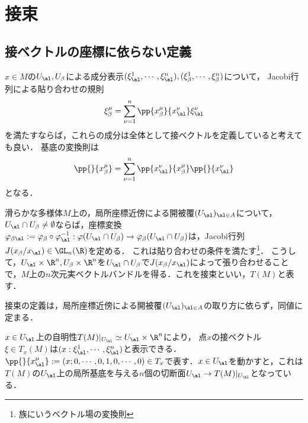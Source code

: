 \documentclass[uplatex,dvipdfmx]{jsreport}
\begin{document}
\section{接束}

\subsection{接ベクトルの座標に依らない定義}

\begin{tcolorbox}[colframe=ForestGreen, colback=ForestGreen!10!white,breakable,colbacktitle=ForestGreen!40!white,coltitle=black,fonttitle=\bfseries\sffamily,
title=]
    $x\in M$の$U_\al,U_\beta$による成分表示$(\xi_\al^1,\cdots,\xi_\al^n),(\xi_\beta^1,\cdots,\xi_\beta^n)$について，
    Jacobi行列による貼り合わせの規則
    \[\xi_\beta^\mu=\sum^n_{\nu=1}\pp{x_\beta^\mu}{x_\al^\nu}\xi_\al^\nu\]
    を満たすならば，これらの成分は全体として接ベクトルを定義していると考えても良い．
    基底の変換則は
    \[\pp{}{x_\beta^\mu}=\sum^n_{\nu=1}\pp{x_\al^\nu}{x_\beta^\mu}\pp{}{x_\al^\nu}\]
    となる．
\end{tcolorbox}

\begin{definition}
    滑らかな多様体$M$上の，局所座標近傍による開被覆$(U_\al)_{\al\in A}$について，
    $U_\al\cap U_\beta\ne\emptyset$ならば，座標変換$\varphi_{\beta\al}:=\varphi_\beta\circ\varphi_\al^{-1}:\varphi(U_\al\cap U_\beta)\to\varphi_\beta(U_\al\cap U_\beta)$は，Jacobi行列$J(x_\beta/x_\al)\in\GL_n(\R)$を定める．
    これは貼り合わせの条件を満たす\footnote{族にいうベクトル場の変換則}．
    こうして，$U_\al\times\R^n,U_\beta\times\R^n$を$U_\al\cap U_\beta$で$J(x_\beta/x_\al)$によって張り合わせることで，$M$上の$n$次元実ベクトルバンドルを得る．これを接束といい，$T(M)$と表す．
\end{definition}

\begin{lemma}
    接束の定義は，局所座標近傍による開被覆$(U_\al)_{\al\in A}$の取り方に依らず，同値に定まる．
\end{lemma}

\begin{remarks}
    $x\in U_\al$上の自明性$T(M)|_{U_\al}\simeq U_\al\times\R^n$により，
    点$x$の接ベクトル$\xi\in T_x(M)$は$(x:\xi^1_\al,\cdots,\xi^n_\al)$と表示できる．
    $\pp{}{x_\al^\mu}:=(x;0,\cdots,0,1,0,\cdots,0)\in T_x$で表す．$x\in U_\al$を動かすと，これは$T(M)$の$U_\al$上の局所基底を与える$n$個の切断面$U_\al\to T(M)|_{U_\al}$となっている．
\end{remarks}
\end{document}
